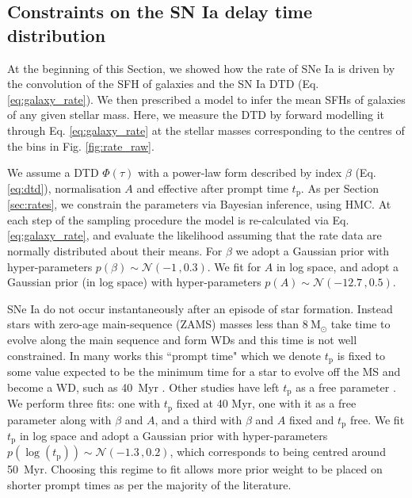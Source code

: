 \documentclass[fleqn,usenatbib]{mnras}
\begin{document}
\subsection{Constraints on the SN Ia delay time distribution}
\label{subsec:results_dtd}

At the beginning of this Section, we showed how the rate of SNe Ia is driven by the convolution of the SFH of galaxies and the SN Ia DTD (Eq. \ref{eq:galaxy_rate}). We then prescribed a model to infer the mean SFHs of galaxies of any given stellar mass. Here, we measure the DTD by forward modelling it through Eq. \ref{eq:galaxy_rate} at the stellar masses corresponding to the centres of the bins in Fig. \ref{fig:rate_raw}. 

We assume a DTD $\Phi(\tau)$ with a power-law form described by index $\beta$ (Eq. \ref{eq:dtd}), normalisation $A$ and effective after prompt time $t_{\mathrm{p}}$. As per Section \ref{sec:rates}, we constrain the parameters via Bayesian inference, using HMC. At each step of the sampling procedure the model is re-calculated via Eq. \ref{eq:galaxy_rate}, and evaluate the likelihood assuming that the rate data are normally distributed about their means. For $\beta$ we adopt a Gaussian prior with hyper-parameters $p(\beta) \sim \mathcal{N}(-1\,,0.3)$. We fit for $A$ in log space, and adopt a Gaussian prior (in log space) with hyper-parameters $p(A) \sim \mathcal{N}(-12.7\,, 0.5)$.

SNe Ia do not occur instantaneously after an episode of star formation. Instead stars with zero-age main-sequence (ZAMS) masses less than $8~\mathrm{M}_{\odot}$ take time to evolve along the main sequence and form WDs and this time is not well constrained. In many works this ``prompt time" which we denote $t_{\mathrm{p}}$ is fixed to some value expected to be the minimum time for a star to evolve off the MS and become a WD, such as 40~Myr \citep{Maoz2012,Graur2013,Graur2014}. Other studies have left $t_{\mathrm{p}}$ as a free parameter \citep{Heringer2019,Castrillo2020}. We perform three fits: one with $t_{\mathrm{p}}$ fixed at 40 Myr, one with it as a free parameter along with $\beta$ and $A$, and a third with $\beta$ and $A$ fixed and  $t_{\mathrm{p}}$ free. We fit $t_{\mathrm{p}}$ in log space and adopt a Gaussian prior with hyper-parameters $p(\log(t_{\mathrm{p}})) \sim \mathcal{N}(-1.3\,,0.2)$, which corresponds to being centred around 50~Myr. Choosing this regime to fit allows more prior weight to be placed on shorter prompt times as per the majority of the literature. 
\end{document}
